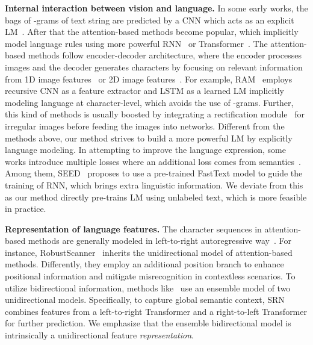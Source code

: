 \documentclass[10pt,journal,compsoc]{IEEEtran}
\begin{document}
\noindent\textbf{Internal interaction between vision and language.} In some early works, the bags of -grams of text string are predicted by a CNN which acts as an explicit LM~\cite{jaderberg2015deep,jaderberg2014deep,jaderberg2014synthetic}. After that the attention-based methods become popular, which implicitly model language rules using more powerful RNN~\cite{lee2016recursive,shi2018aster} or Transformer~\cite{wang2019simple,sheng2019nrtr}. The attention-based methods follow encoder-decoder architecture, where the encoder processes images and the decoder generates characters by focusing on relevant information from 1D image features~\cite{lee2016recursive,shi2016robust,shi2018aster,cheng2017focusing,cheng2018aon} or 2D image features~\cite{yang2017learning,wojna2017attention,liao2019scene, li2019show}. For example, RAM~\cite{lee2016recursive} employs recursive CNN as a feature extractor and LSTM as a learned LM implicitly modeling language at character-level, which avoids the use of -grams. Further, this kind of methods is usually boosted by integrating a rectification module~\cite{shi2018aster,zhan2019esir,yang2019symmetry} for irregular images before feeding the images into networks. Different from the methods above, our method strives to build a more powerful LM by explicitly language modeling. In attempting to improve the language expression, some works introduce multiple losses where an additional loss comes from semantics~\cite{qiao2020seed, lyu20192d, yu2020towards, fang2018attention}. Among them, SEED~\cite{qiao2020seed} proposes to use a pre-trained FastText model to guide the training of RNN, which brings extra linguistic information. We deviate from this as our method directly pre-trains LM using unlabeled text, which is more feasible in practice.


\noindent\textbf{Representation of language features.} The character sequences in attention-based methods are generally modeled in left-to-right autoregressive way~\cite{lee2016recursive, shi2016robust, cheng2017focusing, yue2020robustscanner}. For instance, RobustScanner~\cite{yue2020robustscanner} inherits the unidirectional model of attention-based methods. Differently, they employ an additional position branch to enhance positional information and mitigate misrecognition in contextless scenarios. To utilize bidirectional information, methods like~\cite{graves2008novel, shi2018aster, wang2020decoupled, yu2020towards} use an ensemble model of two unidirectional models. Specifically, to capture global semantic context, SRN~\cite{yu2020towards} combines features from a left-to-right Transformer and a right-to-left Transformer for further prediction. We emphasize that the ensemble bidirectional model is intrinsically a unidirectional feature \emph{representation}.
\end{document}
